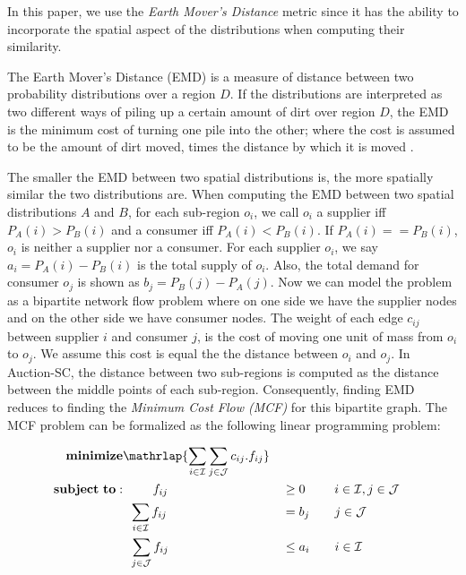 In this paper, we use the \textit{Earth Mover's Distance} metric since it has the ability to incorporate the spatial aspect of the distributions when computing their similarity.

\begin{definition}
The Earth Mover's Distance (EMD) is a measure of distance between two probability distributions over a region $D$. If the distributions are interpreted as two different ways of piling up a certain amount of dirt over region $D$, the EMD is the minimum cost of turning one pile into the other; where the cost is assumed to be the amount of dirt moved, times the distance by which it is moved \cite{Rubner98}.
\end{definition}

The smaller the EMD between two spatial distributions is, the more spatially similar the two distributions are. When computing the EMD between two spatial distributions $A$ and $B$, for each sub-region $o_i$, we call $o_i$ a supplier iff $P_A(i) > P_B(i)$ and a consumer iff $P_A(i) < P_B(i)$. If $P_A(i) == P_B(i)$, $o_i$ is neither a supplier nor a consumer. For each supplier $o_i$, we say $a_i = P_A(i) - P_B(i)$ is the total supply of $o_i$. Also, the total demand for consumer $o_j$ is shown as $b_j = P_B(j) - P_A(j)$. Now we can model the problem as a bipartite network flow problem where on one side we have the supplier nodes and on the other side we have consumer nodes. The weight of each edge $c_{ij}$ between supplier $i$ and consumer $j$, is the cost of moving one unit of mass from $o_i$ to $o_j$. We assume this cost is equal the the distance between $o_i$ and $o_j$. In Auction-SC, the distance between two sub-regions is computed as the distance between the middle points of each sub-region. Consequently, finding EMD reduces to finding the \textit{Minimum Cost Flow (MCF)} for this bipartite graph. The MCF problem can be formalized as the following linear programming problem:


\setcounter{equation}{0}
\begin{alignat}{2}
\mathbf{minimize}&\mathrlap{\sum_{i \in \mathcal{I}} \sum_{j \in \mathcal{J}} c_{ij}.f_{ij}} \notag\\
\mathbf{subject\ to:}&\phantom{{a}={a}} f_{ij} && \geq 0 \ \quad\quad i \in \mathcal{I}, j \in \mathcal{J}\\
&\phantom{{a}}\sum_{i \in \mathcal{I}} f_{ij} &&= b_j \quad\quad j \in \mathcal{J}\\
&\phantom{{a}}\sum_{j \in \mathcal{J}} f_{ij} &&\leq a_i \quad\quad i \in \mathcal{I}
\end{alignat}

